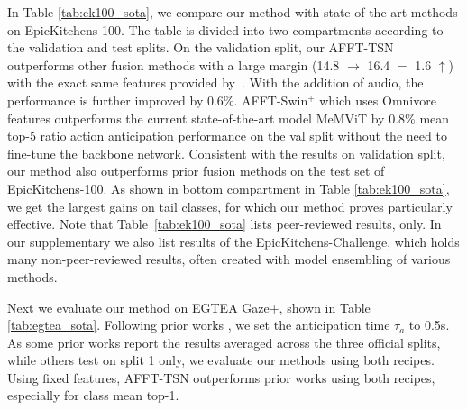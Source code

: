 \documentclass[10pt,twocolumn,letterpaper,dvipsnames]{article}
\newcommand{\sname}{AFFT}
\begin{document}
In Table \ref{tab:ek100_sota}, we compare our method with state-of-the-art methods on EpicKitchens-100. The table is divided into two compartments according to the validation and test splits. On the validation split, our \sname-TSN outperforms other fusion methods with a large margin (14.8 $\rightarrow$ 16.4 $=$ 1.6 $\uparrow$) with the exact same features provided by~\cite{furnariWhatWouldYou2019}. With the addition of audio, the performance is further improved by 0.6\%. \sname-Swin$^+$ which uses Omnivore features outperforms the current state-of-the-art model MeMViT by 0.8\% mean top-5 ratio action anticipation performance on the val split without the need to fine-tune the backbone network.
Consistent with the results on validation split, our method also outperforms prior fusion methods on the test set of EpicKitchens-100. As shown in bottom compartment in Table \ref{tab:ek100_sota}, we get the largest gains on tail classes, for which our method proves particularly effective. Note that Table~\ref{tab:ek100_sota} lists peer-reviewed results, only. In our supplementary we also list results of the EpicKitchens-Challenge, which holds many non-peer-reviewed results, often created with model ensembling of various methods.

Next we evaluate our method on EGTEA Gaze+, shown in Table \ref{tab:egtea_sota}. Following prior works \cite{liuForecastingHumanObjectInteraction2020,girdharAnticipativeVideoTransformer2021}, we set the anticipation time $\tau_a$ to 0.5s. As some prior works report the results averaged across the three official splits, while others test on split 1 only, we evaluate our methods using both recipes. Using fixed features, \sname-TSN outperforms prior works using both recipes, especially for class mean top-1.
\end{document}
